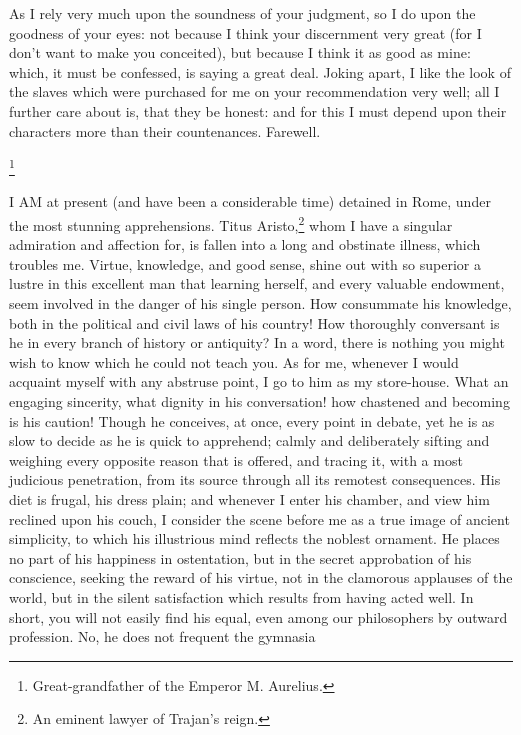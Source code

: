 
As I rely very much upon the soundness of your judgment, so I do upon the
goodness of your eyes: not because I think your discernment very great
(for I don't want to make you conceited), but because I think it as good
as mine: which, it must be confessed, is saying a great deal. Joking
apart, I like the look of the slaves which were purchased for me on your
recommendation very well; all I further care about is, that they be
honest: and for this I must depend upon their characters more than their
countenances. Farewell.


\footnote{Great-grandfather of the
Emperor M. Aurelius.}

I AM at present (and have been a considerable time) detained in Rome,
under the most stunning apprehensions. Titus Aristo,\footnote{An eminent lawyer of
Trajan's reign.} whom I have a singular
admiration and affection for, is fallen into a long and obstinate illness,
which troubles me. Virtue, knowledge, and good sense, shine out with so
superior a lustre in this excellent man that learning herself, and every
valuable endowment, seem involved in the danger of his single person. How
consummate his knowledge, both in the political and civil laws of his
country! How thoroughly conversant is he in every branch of history or
antiquity? In a word, there is nothing you might wish to know which he
could not teach you. As for me, whenever I would acquaint myself with any
abstruse point, I go to him as my store-house. What an engaging
sincerity, what dignity in his conversation! how chastened and becoming is
his caution! Though he conceives, at once, every point in debate, yet he
is as slow to decide as he is quick to apprehend; calmly and deliberately
sifting and weighing every opposite reason that is offered, and tracing
it, with a most judicious penetration, from its source through all its
remotest consequences. His diet is frugal, his dress plain; and whenever I
enter his chamber, and view him reclined upon his couch, I consider the
scene before me as a true image of ancient simplicity, to which his
illustrious mind reflects the noblest ornament. He places no part of his
happiness in ostentation, but in the secret approbation of his conscience,
seeking the reward of his virtue, not in the clamorous applauses of the
world, but in the silent satisfaction which results from having acted
well. In short, you will not easily find his equal, even among our
philosophers by outward profession. No, he does not frequent the gymnasia
